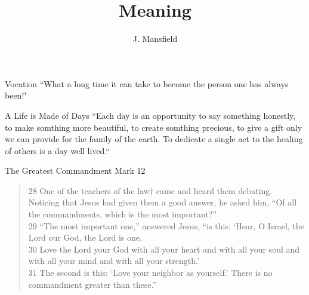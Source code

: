 \documentclass{beamer}
\title{Meaning}
\author{J. Mansfield}
\institute{Regis~University}
\begin{document}
\begin{frame}
\titlepage
\end{frame}

\begin{frame}
\begin{block}{Vocation}
 ``What a long time it can take to become the person one has always been!"~\cite{palmer}
\end{block}

\end{frame}

\begin{frame}
\begin{block}{A Life is Made of Days}
``Each day is an opportunity to say something honestly, to make somthing more beautiful, to create somthing precious, to give a gift only we can provide for the family of the earth. To dedicate a single act to the healing of others is a day well lived.``~\cite{muller}
\end{block}
\end{frame}


\begin{frame}
\begin{block}{The Greatest Commandment}
Mark 12
\begin{verse}
28 One of the teachers of the law† came and heard them debating. Noticing that Jesus had given them a good answer, he asked him, “Of all the commandments, which is the most important?” \\
29 “The most important one,” answered Jesus, “is this: ‘Hear, O Israel, the Lord our God, the Lord is one.\\
30 Love the Lord your God with all your heart and with all your soul and with all your mind and with all your strength.’\\
31 The second is this: ‘Love your neighbor as yourself.’ There is no commandment greater than these.” \\
\end{verse}
\cite[Kindle Locations 95560-95569]{niv}
\end{block}
\end{frame}

\begin{frame}
    \nocite{*}
    
    
\end{frame}
\end{document}
